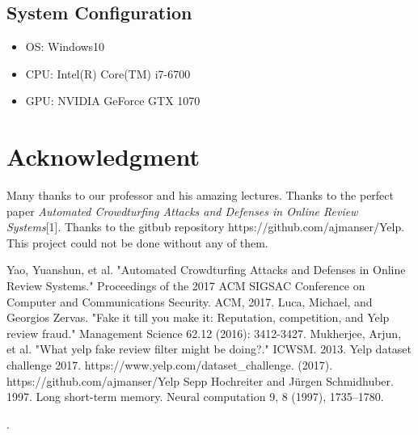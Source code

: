 \documentclass[conference]{IEEEtran}
\begin{document}
\subsection{System Configuration} 
\begin{itemize}
\item OS: Windows10
\item CPU: Intel(R) Core(TM) i7-6700
\item GPU: NVIDIA GeForce GTX 1070
\end{itemize}


\section*{Acknowledgment}
Many thanks to our professor and his amazing lectures. Thanks to the perfect paper \emph{Automated Crowdturfing Attacks and Defenses in Online Review Systems}[1]. Thanks to the gitbub repository https://github.com/ajmanser/Yelp. This project could not be done without any of them.


\begin{thebibliography}{00}
 Yao, Yuanshun, et al. "Automated Crowdturfing Attacks and Defenses in Online Review Systems." Proceedings of the 2017 ACM SIGSAC Conference on Computer and Communications Security. ACM, 2017.
 Luca, Michael, and Georgios Zervas. "Fake it till you make it: Reputation, competition, and Yelp review fraud." Management Science 62.12 (2016): 3412-3427.
 Mukherjee, Arjun, et al. "What yelp fake review filter might be doing?." ICWSM. 2013.
 Yelp dataset challenge 2017. https://www.yelp.com/dataset\_challenge. (2017).
 https://github.com/ajmanser/Yelp
 Sepp Hochreiter and Jürgen Schmidhuber. 1997. Long short-term memory. Neural computation 9, 8 (1997), 1735–1780.
\end{thebibliography}
.
\end{document}
